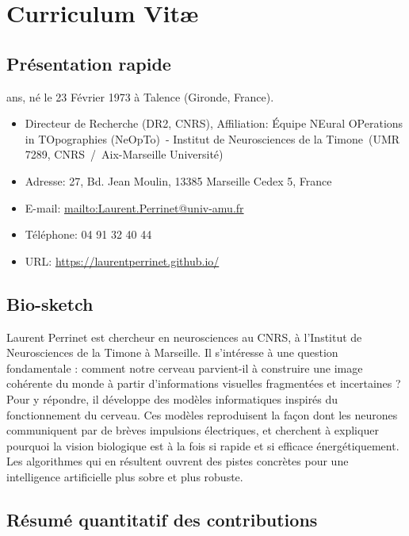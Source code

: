 \documentclass[10pt,french,a4paper]{article}%
\makeatletter
\newcommand{\Team}{\'Equipe NEural OPerations in TOpographies (NeOpTo)}%
\newcommand{\Institute}{Institut de Neurosciences de la Timone}%
\newcommand{\InstituteUMR}{UMR 7289, CNRS~/~Aix-Marseille Université}%
\newcommand{\Address}{27, Bd. Jean Moulin, 13385 Marseille Cedex 5, France}
\newcommand{\Website}{https://laurentperrinet.github.io/}
\newcommand{\Email}{Laurent.Perrinet@univ-amu.fr}
\makeatother
\begin{document}
\tableofcontents
\newpage

\section{Curriculum Vit\ae\ }
\subsection{Présentation rapide}%
 ans, né le 23 Février 1973 à Talence (Gironde, France).  %

\begin{itemize}
	\item Directeur de Recherche (DR2, CNRS), Affiliation: \Team\ - \Institute\ (\InstituteUMR)
	\item Adresse: \Address
	\item E-mail: \url{mailto:\Email}
	\item Téléphone: 04 91 32 40 44
	\item URL: \url{\Website}
\end{itemize}

\subsection*{Bio-sketch}
Laurent Perrinet est chercheur en neurosciences au CNRS, à l'Institut de Neurosciences de la Timone à Marseille. Il s'intéresse à une question fondamentale : comment notre cerveau parvient-il à construire une image cohérente du monde à partir d'informations visuelles fragmentées et incertaines ?
Pour y répondre, il développe des modèles informatiques inspirés du fonctionnement du cerveau. Ces modèles reproduisent la façon dont les neurones communiquent par de brèves impulsions électriques, et cherchent à expliquer pourquoi la vision biologique est à la fois si rapide et si efficace énergétiquement. Les algorithmes qui en résultent ouvrent des pistes concrètes pour une intelligence artificielle plus sobre et plus robuste.

\subsection*{Résumé quantitatif des contributions}
\end{document}

